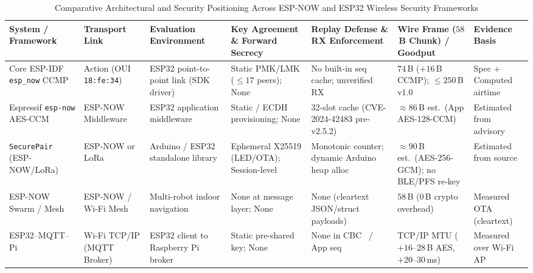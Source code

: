 \documentclass[conference]{IEEEtran}
\renewcommand{\arraystretch}{0.96}
\begin{document}
\begin{table}[t]
\centering
\caption{Comparative Architectural and Security Positioning Across ESP-NOW and ESP32 Wireless Security Frameworks}
\label{tab:related_work}
\setlength{\tabcolsep}{3pt}
\scriptsize
\renewcommand{\arraystretch}{1.02}
\begin{tabularx}{\textwidth}{@{}>{\raggedright\arraybackslash}p{}>{\raggedright\arraybackslash}p{}>{\raggedright\arraybackslash}p{}>{\raggedright\arraybackslash}p{}X>{\raggedright\arraybackslash}p{}>{\raggedright\arraybackslash}p{}@{}}
\toprule
\textbf{System / Framework} & \textbf{Transport Link} & \textbf{Evaluation Environment} & \textbf{Key Agreement \& Forward Secrecy} & \textbf{Replay Defense \& RX Enforcement} & \textbf{Wire Frame ($58$\,B Chunk) / Goodput} & \textbf{Evidence Basis} \\
\midrule
Core ESP-IDF \texttt{esp\_now} CCMP~\cite{espressif_espnow,espressif_issue15179} & 802.11 Action (OUI \texttt{18:fe:34}) & ESP32 point-to-point link (SDK driver) & Static PMK/LMK ($\le 17$ peers); None & No built-in seq cache; unverified RX~\cite{espressif_issue15179} & $74$\,B ($+16$\,B CCMP); $\le 250$\,B v1.0 & Spec + Computed airtime \\
Espressif \texttt{esp-now} AES-CCM~\cite{nozomi2024,nvd_cve42483} & ESP-NOW Middleware & ESP32 application middleware & Static / ECDH provisioning; None & 32-slot cache (CVE-2024-42483 pre-v2.5.2) & $\approx 86$\,B est.\ (App AES-128-CCM) & Estimated from advisory~\cite{nozomi2024} \\
\texttt{SecurePair} (ESP-NOW/LoRa)~\cite{securepair2026} & ESP-NOW or LoRa & Arduino / ESP32 standalone library & Ephemeral X25519 (LED/OTA); Session-level & Monotonic counter; dynamic Arduino heap alloc & $\approx 90$\,B est.\ (AES-256-GCM); no BLE/PFS re-key & Estimated from source \\
ESP-NOW Swarm / Mesh~\cite{caniago2026} & ESP-NOW / Wi-Fi Mesh & Multi-robot indoor navigation & None at message layer; None & None (cleartext JSON/struct payloads) & $58$\,B ($0$\,B crypto overhead) & Measured OTA (cleartext) \\
ESP32--MQTT--Pi~\cite{setiawan2021,amirkhanova2026} & Wi-Fi TCP/IP (MQTT Broker) & ESP32 client to Raspberry Pi broker & Static pre-shared key; None & None in CBC~\cite{setiawan2021} / App seq~\cite{amirkhanova2026} & TCP/IP MTU ($+16\text{--}28$\,B AES, $+20\text{--}30$\,ms) & Measured over Wi-Fi AP \\

\end{tabularx}
\end{table}
\end{document}
